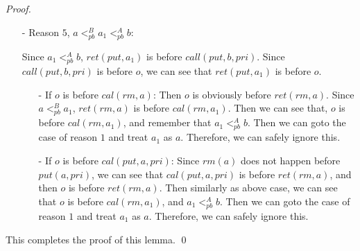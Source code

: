 \begin {proof}
\begin{itemize}
    According to above discussion, there are three possible enumeration of operations of $a$, $a_1$ and $b$, as shown in \figurename~\ref{fig:history enumeration 3 for PQ1Equal}, \figurename~\ref{fig:history enumeration 4 for PQ1Equal} and \figurename~\ref{fig:history enumeration 5 for PQ1Equal}. Here we explicitly draw the leftmost gap-point of $a$ as $o'$. Since the position of $\textit{ret}(\textit{put},a_1,\textit{pri})$ and $\textit{cal}(\textit{put},a,\textit{pri})$ do not influence the correctness, we can simply ignore it. We also ignore $\textit{cal}(\textit{put},b,\textit{pri})$ and $\textit{ret}(\textit{put},b)$, since the only requirements of them are (1) $\textit{rm}(b)$ does not happen before $\textit{put}(b)$ and (2) $\textit{cal}(\textit{put},b,\textit{pri})$ is before $o$.

\item[-] Reason $5$, $a <_{\textit{pb}}^B a_1 <_{\textit{pb}}^A b$:

    Since $a_1 <_{\textit{pb}}^A b$, $\textit{ret}(\textit{put},a_1)$ is before $\textit{call}(\textit{put},b,\textit{pri})$. Since $\textit{call}(\textit{put},b,\textit{pri})$ is before $o$, we can see that $\textit{ret}(\textit{put},a_1)$ is before $o$.

    \begin{itemize}
    \setlength{\itemsep}{0.5pt}
    \item[-] If $o$ is before $\textit{cal}(\textit{rm},a)$: Then $o$ is obviously before $\textit{ret}(\textit{rm},a)$. Since $a <_{\textit{pb}}^B a_1$, $\textit{ret}(\textit{rm},a)$ is before $\textit{cal}(\textit{rm},a_1)$. Then we can see that, $o$ is before $\textit{cal}(\textit{rm},a_1)$, and remember that $a_1 <_{\textit{pb}}^A b$. Then we can goto the case of reason $1$ and treat $a_1$ as $a$. Therefore, we can safely ignore this.

    \item[-] If $o$ is before $\textit{cal}(\textit{put},a,\textit{pri})$: Since $\textit{rm}(a)$ does not happen before $\textit{put}(a,\textit{pri})$, we can see that $\textit{cal}(\textit{put},a,\textit{pri})$ is before $\textit{ret}(\textit{rm},a)$, and then $o$ is before $\textit{ret}(\textit{rm},a)$. Then similarly as above case, we can see that $o$ is before $\textit{cal}(\textit{rm},a_1)$, and $a_1 <_{\textit{pb}}^A b$. Then we can goto the case of reason $1$ and treat $a_1$ as $a$. Therefore, we can safely ignore this.
    \end{itemize}
\end{itemize}

This completes the proof of this lemma. \qed
\end {proof}

